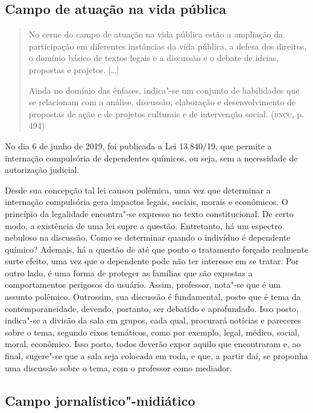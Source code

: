 \documentclass[11pt]{extarticle}
\begin{document}
\subsection{Campo de atuação na vida pública}

\begin{quote}
No cerne do campo de atuação na vida pública estão a ampliação da
participação em diferentes instâncias da vida pública, a defesa dos
direitos, o domínio básico de textos legais e a discussão e o debate de
ideias, propostas e projetos. {[}\ldots{}{]}

Ainda no domínio das ênfases, indica"-se um conjunto de habilidades que
se relacionam com a análise, discussão, elaboração e desenvolvimento de
propostas de ação e de projetos culturais e de intervenção social.
(\textsc{bncc}, p. 494)
\end{quote}

No dia 6 de junho de 2019, foi publicada a Lei 13.840/19, que permite
a internação compulsória de dependentes químicos, ou seja, sem a
necessidade de autorização judicial.

Desde sua concepção tal lei causou polêmica, uma vez que determinar a
internação compulsória gera impactos legais, sociais, morais e
econômicos. O princípio da legalidade encontra"-se expresso no texto
constitucional. De certo modo, a existência de uma lei supre a questão.
Entretanto, há um espectro nebuloso na discussão. Como se determinar
quando o indivíduo é dependente químico? Ademais, há a questão de até
que ponto o tratamento forçado realmente surte efeito, uma vez que o
dependente pode não ter interesse em se tratar. Por outro lado, é uma
forma de proteger as famílias que são expostas a comportamentos
perigosos do usuário. Assim, professor, nota"-se que é um assunto
polêmico. Outrossim, sua discussão é fundamental, posto que é tema da
contemporaneidade, devendo, portanto, ser debatido e aprofundado. Isso
posto, indica"-se a divisão da sala em grupos, cada qual, procurará
notícias e pareceres sobre o tema, segundo eixos temáticos, como por
exemplo, legal, médico, social, moral, econômico. Isso posto, todos
deverão expor aquilo que encontraram e, ao final, sugere"-se que a sala
seja colocada em roda, e que, a partir daí, se proponha uma discussão
sobre o tema, com o professor como mediador.

\subsection{Campo jornalístico"-midiático}
\end{document}
